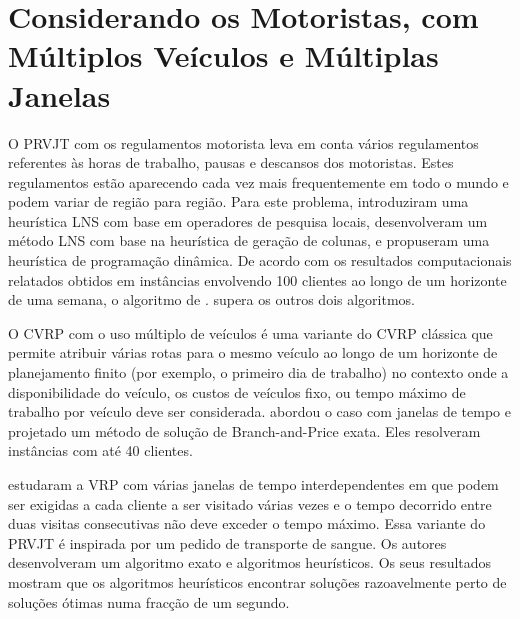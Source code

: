 \section{Considerando os Motoristas, com Múltiplos Veículos e Múltiplas Janelas}

O PRVJT com os regulamentos motorista leva em conta vários regulamentos referentes às horas de trabalho, pausas e descansos dos motoristas. Estes regulamentos estão aparecendo cada vez mais frequentemente em todo o mundo e podem variar de região para região. Para este problema, \cite{goel08} introduziram uma heurística LNS com base em operadores de pesquisa locais, \cite{prescott09} desenvolveram um método LNS com base na heurística de geração de colunas, e \cite{kok10} propuseram uma heurística de programação dinâmica. De acordo com os resultados computacionais relatados obtidos em instâncias envolvendo 100 clientes ao longo de um horizonte de uma semana, o algoritmo de \cite{prescott09}. supera os outros dois algoritmos.

O CVRP com o uso múltiplo de veículos é uma variante do CVRP clássica que permite atribuir várias rotas para o mesmo veículo ao longo de um horizonte de planejamento finito (por exemplo, o primeiro dia de trabalho) no contexto onde a disponibilidade do veículo, os custos de veículos fixo, ou tempo máximo de trabalho por veículo deve ser considerada. \cite{azi12} abordou o caso com janelas de tempo e projetado um método de solução de Branch-and-Price exata. Eles resolveram instâncias com até 40 clientes.

\cite{doerner10} estudaram a VRP com várias janelas de tempo interdependentes em que podem ser exigidas a cada cliente a ser visitado várias vezes e o tempo decorrido entre duas visitas consecutivas não deve exceder o tempo máximo. Essa variante do PRVJT é inspirada por um pedido de transporte de sangue. Os autores desenvolveram um algoritmo exato e algoritmos heurísticos. Os seus resultados mostram que os algoritmos heurísticos encontrar soluções razoavelmente perto de soluções ótimas numa fracção de um segundo.

